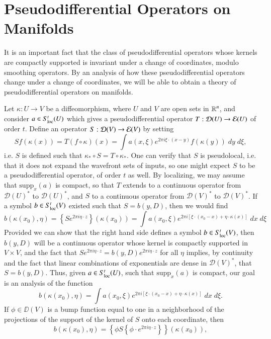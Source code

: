 \section{Pseudodifferential Operators on Manifolds}

It is an important fact that the class of pseudodifferential operators whose kernels are compactly supported is invariant under a change of coordinates, modulo smoothing operators. By an analysis of how these pseudodifferential operators change under a change of coordinates, we will be able to obtain a theory of pseudodifferential operators on manifolds.

Let $\kappa: U \to V$ be a diffeomorphism, where $U$ and $V$ are open sets in $\operatorname{\mathbb{R}}^n$, and consider $a \in S^t_{\text{loc}}(U)$ which gives a pseudodifferential operator $T: \operatorname{\mathcal{D}}(U) \to \operatorname{\mathcal{E}}(U)$ of order $t$. Define an operator $S: \operatorname{\mathcal{D}}(V) \to \operatorname{\mathcal{E}}(V)$ by setting
%
\[ Sf(\kappa(x)) = T(f \circ \kappa)(x) = \int a(x,\xi) e^{2 \pi i \xi \cdot (x - y)} f(\kappa(y))\; dy\; d\xi, \]
%
i.e. $S$ is defined such that $\kappa_* \circ S = T \circ \kappa_*$. One can verify that $S$ is pseudolocal, i.e. that it does not expand the wavefront sets of inputs, so one might expect $S$ to be a pseudodifferential operator, of order $t$ as well. By localizing, we may assume that $\text{supp}_x(a)$ is compact, so that $T$ extends to a continuous operator from $\mathcal{D}(U)^*$ to $\mathcal{D}(U)^*$, and $S$ to a continuous operator from $\mathcal{D}(V)^*$ to $\mathcal{D}(V)^*$. If a symbol $b \in S_{\text{loc}}^t(V)$ existed such that $S = b(y,D)$, then we would find
%
\[ b(\kappa(x_0),\eta) = \left\{ S e^{2 \pi i \eta \cdot z} \right\}(\kappa(x_0)) = \int a(x_0,\xi) e^{2 \pi i [\xi \cdot (x_0 - x) + \eta \cdot \kappa(x)]}\; dx\; d\xi \]
%
Provided we can show that the right hand side defines a symbol $b \in S_{\text{loc}}^t(V)$, then $b(y,D)$ will be a continuous operator whose kernel is compactly supported in $V \times V$, and the fact that $S e^{2 \pi i \eta \cdot z} = b(y,D) e^{2 \pi i \eta \cdot z}$ for all $\eta$ implies, by continuity and the fact that linear combinations of exponentials are dense in $\mathcal{D}(V)^*$, that $S = b(y,D)$. Thus, given $a \in S_{\text{loc}}^t(U)$, such that $\text{supp}_x(a)$ is compact, our goal is an analysis of the function
%
\[ b(\kappa(x_0),\eta) = \int a(x_0,\xi) e^{2 \pi i [ \xi \cdot (x_0 - x) + \eta \cdot \kappa(x) ]}\; dx\; d\xi. \]
%
If $\phi \in \DD(V)$ is a bump function equal to one in a neighborhood of the projections of the support of the kernel of $S$ onto each coordinate, then
%
\[ b(\kappa(x_0),\eta) = \left\{ \phi S \left\{ \phi \cdot e^{2 \pi i \eta \cdot z} \right\} \right\}(\kappa(x_0)), \]
